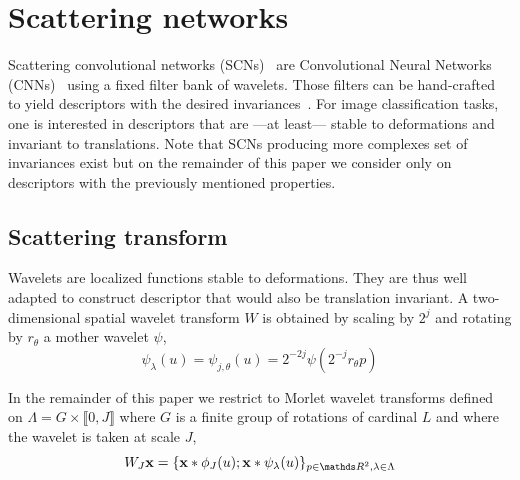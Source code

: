 \documentclass{article}
\begin{document}
  

\section{Scattering networks}
  \label{sec:SCN}
    Scattering convolutional networks (SCNs)~\cite{bruna2013scattering} are Convolutional Neural Networks (CNNs)~\cite{lecun1995convolutional} using a fixed filter bank of wavelets. Those filters can be hand-crafted to yield descriptors with the desired invariances~\cite{mallat2012gis}. For image classification tasks, one is interested in descriptors that are ---at least--- stable to deformations and invariant to translations. Note that SCNs producing more complexes set of invariances exist but on the remainder of this paper we consider only on descriptors with the previously mentioned properties.

  \subsection{Scattering transform}
    \label{subsec:SCN/ST} 
    Wavelets are localized functions stable to deformations. They are thus well adapted to construct descriptor that would also be translation invariant. A two-dimensional spatial wavelet transform $W$ is obtained by scaling by $2^{j}$ and rotating by $r_{\theta}$ a mother wavelet $\psi$,
    \vspace{-5pt}
    \begin{equation}
      \label{eq:multi-scale directional wavelet}
      \psi_{\lambda}(u) = \psi_{j,\theta}(u) = 2^{-2j} \psi(2^{-j}r_{\theta}p)
    \end{equation}
    
    In the remainder of this paper we restrict to Morlet wavelet transforms defined on $\Lambda = G \times \llbracket 0,J \rrbracket$ where $G$ is a finite group of rotations of cardinal $L$ and where the wavelet is taken at scale $J$,
    \vspace{-5pt}
    \begin{equation}
      \label{eq:wavelet transform}
      W_{J}\bfx = \{ \bfx \ast \phi_{J}(u); \bfx \ast \psi_{\lambda}(u) \}_{p\in\dsR^{2},\lambda \in \Lambda}
    \end{equation}
    \vspace{-15pt}
\end{document}
